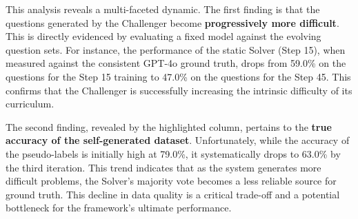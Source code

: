 
This analysis reveals a multi-faceted dynamic. The first finding is that the questions generated by the Challenger become \textbf{progressively more difficult}. This is directly evidenced by evaluating a fixed model against the evolving question sets. For instance, the performance of the static Solver (Step 15), when measured against the consistent GPT-4o ground truth, drops from 59.0\% on the questions for the Step 15 training to 47.0\% on the questions for the Step 45. This confirms that the Challenger is successfully increasing the intrinsic difficulty of its curriculum.

The second finding, revealed by the highlighted column, pertains to the \textbf{true accuracy of the self-generated dataset}. Unfortunately, while the accuracy of the pseudo-labels is initially high at 79.0\%, it systematically drops to 63.0\% by the third iteration. This trend indicates that as the system generates more difficult problems, the Solver's majority vote becomes a less reliable source for ground truth. This decline in data quality is a critical trade-off and a potential bottleneck for the framework's ultimate performance.
